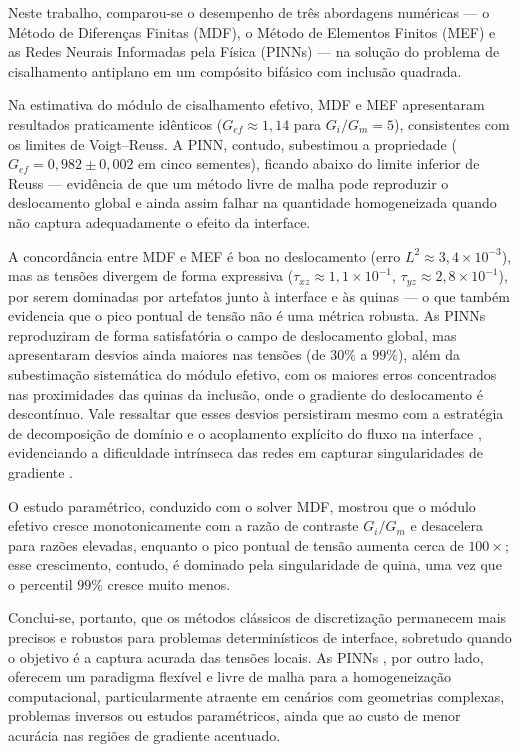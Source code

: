 \documentclass[brazil]{TCAM} %
\begin{document}
Neste trabalho, comparou-se o desempenho de três abordagens numéricas — o Método de Diferenças Finitas (MDF), o Método de Elementos Finitos (MEF) e as Redes Neurais Informadas pela Física (PINNs) — na solução do problema de cisalhamento antiplano em um compósito bifásico com inclusão quadrada.

Na estimativa do módulo de cisalhamento efetivo, MDF e MEF apresentaram resultados praticamente idênticos ($G_{ef} \approx 1{,}14$ para $G_i/G_m = 5$), consistentes com os limites de Voigt--Reuss. A PINN, contudo, subestimou a propriedade ($G_{ef} = 0{,}982 \pm 0{,}002$ em cinco sementes), ficando abaixo do limite inferior de Reuss --- evidência de que um método livre de malha pode reproduzir o deslocamento global e ainda assim falhar na quantidade homogeneizada quando não captura adequadamente o efeito da interface.

A concordância entre MDF e MEF é boa no deslocamento (erro $L^2 \approx 3{,}4\times10^{-3}$), mas as tensões divergem de forma expressiva ($\tau_{xz}\approx 1{,}1\times10^{-1}$, $\tau_{yz}\approx 2{,}8\times10^{-1}$), por serem dominadas por artefatos junto à interface e às quinas --- o que também evidencia que o pico pontual de tensão não é uma métrica robusta. As PINNs reproduziram de forma satisfatória o campo de deslocamento global, mas apresentaram desvios ainda maiores nas tensões (de $30\%$ a $99\%$), além da subestimação sistemática do módulo efetivo, com os maiores erros concentrados nas proximidades das quinas da inclusão, onde o gradiente do deslocamento é descontínuo. Vale ressaltar que esses desvios persistiram mesmo com a estratégia de decomposição de domínio e o acoplamento explícito do fluxo na interface \cite{jagtap2020conservative}, evidenciando a dificuldade intrínseca das redes em capturar singularidades de gradiente \cite{wang2021understanding}.

O estudo paramétrico, conduzido com o solver MDF, mostrou que o módulo efetivo cresce monotonicamente com a razão de contraste $G_i/G_m$ e desacelera para razões elevadas, enquanto o pico pontual de tensão aumenta cerca de $100\times$; esse crescimento, contudo, é dominado pela singularidade de quina, uma vez que o percentil $99\%$ cresce muito menos.

Conclui-se, portanto, que os métodos clássicos de discretização permanecem mais precisos e robustos para problemas determinísticos de interface, sobretudo quando o objetivo é a captura acurada das tensões locais. As PINNs \cite{raissi2019pinn}, por outro lado, oferecem um paradigma flexível e livre de malha para a homogeneização computacional, particularmente atraente em cenários com geometrias complexas, problemas inversos ou estudos paramétricos, ainda que ao custo de menor acurácia nas regiões de gradiente acentuado.
\end{document}
